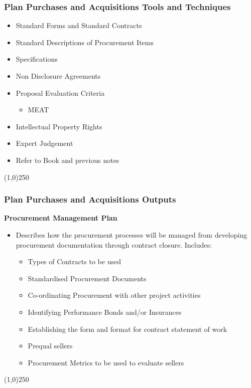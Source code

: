 \begin{frame}
\frametitle{Plan Purchases and Acquisitions \hfill\hfill Tools and Techniques}

\begin{itemize}
\item Standard Forms and Standard Contracts
\item Standard Descriptions of Procurement Items
\item Specifications
\item Non Disclosure Agreements
\item Proposal Evaluation Criteria
		\begin{itemize}
		\item MEAT
		\end{itemize}
\item Intellectual Property Rights
\item Expert Judgement
\item Refer to Book and previous notes
\end{itemize}
\end{frame}\begin{center}\line(1,0){250}\end{center}



\begin{frame}
\frametitle{Plan Purchases and Acquisitions \hfill\hfill Outputs}
\textbf{Procurement Management Plan}
\begin{itemize}
	\item Describes how the procurement processes will be managed from developing procurement documentation through contract closure.  Includes:
		\begin{itemize}
			\item Types of Contracts to be used
			\item Standardised Procurement Documents
			\item Co-ordinating Procurement with other project activities
			\item Identifying Performance Bonds and/or Insurances
			\item Establishing the form and format for contract statement of work
			\item Prequal sellers
			\item Procurement Metrics to be used to evaluate sellers
		\end{itemize}
\end{itemize}
\end{frame}\begin{center}\line(1,0){250}\end{center}




